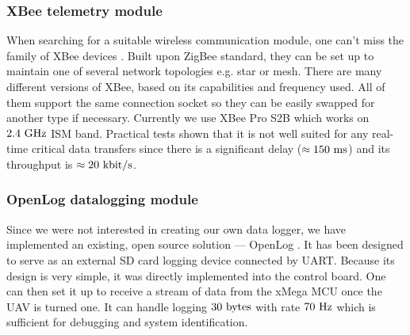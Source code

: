 \subsubsection{XBee telemetry module}

When searching for a suitable wireless communication module, one can't miss the family of XBee devices \citep{xbee}. Built upon ZigBee standard, they can be set up to maintain one of several network topologies e.g. star or mesh. There are many different versions of XBee, based on its capabilities and frequency used. All of them support the same connection socket so they can be easily swapped for another type if necessary. Currently we use XBee Pro S2B which works on $2.4~\mathrm{GHz}$ ISM band. Practical tests shown that it is not well suited for any real-time critical data transfers since there is a significant delay ($\approx 150~\mathrm{ms}$)  and its throughput is $\approx 20~\mathrm{kbit/s}$.

\subsubsection{OpenLog datalogging module}

Since we were not interested in creating our own data logger, we have implemented an existing, open source solution --- OpenLog \citep{openlog}. It has been designed to serve as an external SD card logging device connected by UART. Because its design is very simple, it was directly implemented into the control board. One can then set it up to receive a stream of data from the xMega MCU once the UAV is turned one. It can handle logging $30~\mathrm{bytes}$ with rate $70~\mathrm{Hz}$ which is sufficient for debugging and system identification.

\usetikzlibrary{shapes.geometric,backgrounds,calc}

